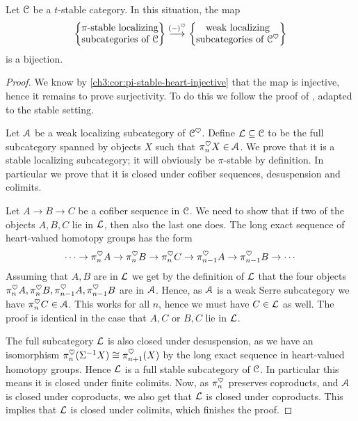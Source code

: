 \begin{theorem}
    \label{ch3:thm:premain}
    Let $\EuScript{C}$ be a $t$-stable category. In this situation, the map 
    \[\left\{ \begin{matrix} \pi\text{-stable localizing}\\ \text{subcategories of }\EuScript{C} \end{matrix} \right\}\overset{(-)^\heartsuit}{\longrightarrow} \left\{ \begin{matrix} \text{weak localizing}\\ \text{subcategories of }\EuScript{C}^\heartsuit \end{matrix} \right\}\] 
    is a bijection. 
\end{theorem}
\begin{proof}
    We know by \cref{ch3:cor:pi-stable-heart-injective} that the map is injective, hence it remains to prove surjectivity. To do this we follow the proof of \cite[C.5.2.7]{lurie_SAG}, adapted to the stable setting. 
    
    Let $\EuScript{A}$ be a weak localizing subcategory of $\EuScript{C}^\heartsuit$. Define $\mathcal{L}\subseteq \EuScript{C}$ to be the full subcategory spanned by objects $X$ such that $\pi_n^\heartsuit X\in \EuScript{A}$. We prove that it is a stable localizing subcategory; it will obviously be $\pi$-stable by definition. In particular we prove that it is closed under cofiber sequences, desuspension and colimits. 

    Let $A\rightarrow B\rightarrow C$ be a cofiber sequence in $\EuScript{C}$. We need to show that if two of the objects $A, B, C$ lie in $\mathcal{L}$, then also the last one does. The long exact sequence of heart-valued homotopy groups has the form 
    \[\cdots\rightarrow \pi^{\heartsuit}_{n}A \rightarrow \pi^{\heartsuit}_{n}B \rightarrow \pi^{\heartsuit}_{n}C \rightarrow \pi^{\heartsuit}_{n-1}A\rightarrow \pi^{\heartsuit}_{n-1}B \rightarrow \cdots \]
    Assuming that $A, B$ are in $\mathcal{L}$ we get by the definition of $\mathcal{L}$ that the four objects $\pi^{\heartsuit}_{n}A, \pi^{\heartsuit}_{n}B, \pi^{\heartsuit}_{n-1}A, \pi^{\heartsuit}_{n-1}B$ are in $\EuScript{A}$. Hence, as $\EuScript{A}$ is a weak Serre subcategory we have $\pi^\heartsuit_n C\in \EuScript{A}$. This works for all $n$, hence we must have $C\in \mathcal{L}$ as well. The proof is identical in the case that $A, C$ or $B, C$ lie in $\mathcal{L}$. 
    
    The full subcategory $\mathcal{L}$ is also closed under desuspension, as we have an isomorphism $\pi_n^\heartsuit (\Sigma^{-1} X)\cong \pi_{n+1}^\heartsuit(X)$ by the long exact sequence in heart-valued homotopy groups. Hence $\mathcal{L}$ is a full stable subcategory of $\EuScript{C}$. In particular this means it is closed under finite colimits. Now, as $\pi_n^\heartsuit$ preserves coproducts, and $\EuScript{A}$ is closed under coproducts, we also get that $\mathcal{L}$ is closed under coproducts. This implies that $\mathcal{L}$ is closed under colimits, which finishes the proof. 
\end{proof}

